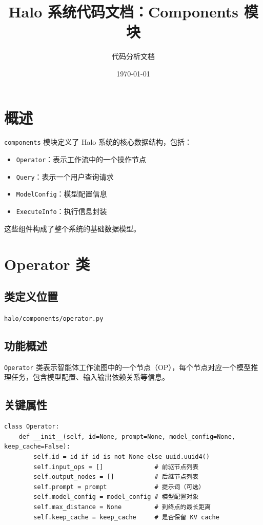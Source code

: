 \documentclass[12pt,a4paper]{article}
\title{Halo 系统代码文档：Components 模块}
\author{代码分析文档}
\date{\today}
\begin{document}
\maketitle

\tableofcontents
\newpage

\section{概述}

\texttt{components} 模块定义了 Halo 系统的核心数据结构，包括：
\begin{itemize}
    \item \texttt{Operator}：表示工作流中的一个操作节点
    \item \texttt{Query}：表示一个用户查询请求
    \item \texttt{ModelConfig}：模型配置信息
    \item \texttt{ExecuteInfo}：执行信息封装
\end{itemize}

这些组件构成了整个系统的基础数据模型。

\section{Operator 类}

\subsection{类定义位置}
\texttt{halo/components/operator.py}

\subsection{功能概述}
\texttt{Operator} 类表示智能体工作流图中的一个节点（OP），每个节点对应一个模型推理任务，包含模型配置、输入输出依赖关系等信息。

\subsection{关键属性}

\begin{lstlisting}
class Operator:
    def __init__(self, id=None, prompt=None, model_config=None, keep_cache=False):
        self.id = id if id is not None else uuid.uuid4()
        self.input_ops = []              # 前驱节点列表
        self.output_nodes = []           # 后继节点列表
        self.prompt = prompt             # 提示词（可选）
        self.model_config = model_config # 模型配置对象
        self.max_distance = None         # 到终点的最长距离
        self.keep_cache = keep_cache     # 是否保留 KV cache
\end{lstlisting}
\end{document}
